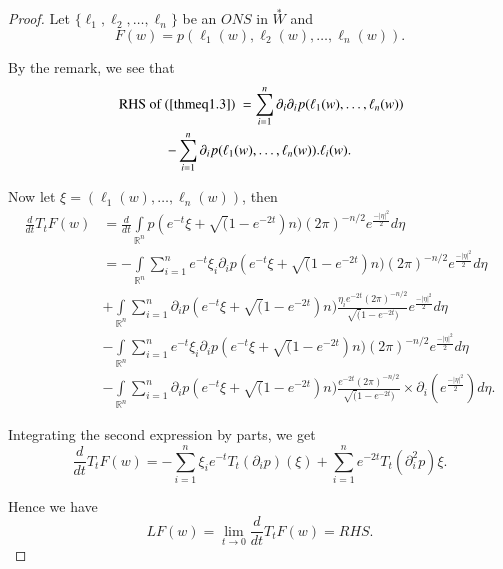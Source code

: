 \begin{proof}
Let $\{\ell_1, \ell_2, \ldots, \ell_n\}$ be an $ONS$ in $\overset{\ast}{W}$ and 
\begin{equation*}
  F(w) = p (\ell_1 (w), \ell_2(w),\ldots, \ell_n (w)).\tag*{$\Box$}
\end{equation*}

By the remark, we see that
\begin{multline*}
  \text{ RHS of  (\ref{thmeq1.3}) } = \sum\limits^{n}_{i=1} \partial_i
  \partial_i 
  p (\ell_1 (w), \ldots, \ell_n (w))\\  
  -\sum^{n}_{i = 1} \partial_i p (\ell_1 (w),
  \ldots, \ell_n (w)). \ell_i (w). 
\end{multline*}

Now let $\xi = (\ell_1 (w), \ldots, \ell_n (w))$, then
\begin{align*}
  \frac{d}{dt} T_tF(w) 
 &= \frac{d}{dt} \int\limits_{\mathbb{R}^n} p
  (e^{-t}\xi + \surd (1 -e^{-2t})n) (2
  \pi)^{-n/2} e^{\frac{-|\eta|^2}{2}}d \eta\\ 
 & = - \int\limits_{\mathbb{R}^n} \sum^{n}_{i = 1} e^{-t} \xi_i
  \partial_i p (e^{-t}\xi + \surd (1 -e^{-2t})n) (2
  \pi)^{-n/2}e^{\frac{-|\eta|^2}{2}}d \eta\\  
 & + \int\limits_{\mathbb{R}^n} \sum^{n}_{i = 1} \partial_i p(e^{-t}
  \xi + \surd (1-e^{-2t})n) \frac{\eta_i e^{-2t} (2\pi)^{-n /2}}{\surd
    (1 - e^{-2t})}e^{\frac{-|\eta|^2}{2}}d \eta \\ 
 & - \int\limits_{\mathbb{R}^n} \sum^{n}_{i = 1}  e^{-t} \xi_i
  \partial_i p (e^{-t} \xi + \surd (1-e^{-2t})n) (2
  \pi)^{-n/2}e^{\frac{-|\eta|^2}{2}}d \eta\\ 
 & -\int\limits_{\mathbb{R}^n} \sum^{n}_{i = 1} \partial_i p(e^{-t}\xi
  + \surd (1 - e^{-2t})n) \frac{e^{-2t} (2 \pi)^{- n / 2}}{\surd (1 -
    e^{-2t})} \times \partial_i (e^\frac{-|\eta|^2}{2})d \eta. 
\end{align*}\pageoriginale

Integrating the second expression by parts, we get
$$
\frac{d}{dt}T_tF(w) = - \sum^{n}_{i = 1} \xi_i e^{-t}T_t (\partial_i
p)(\xi) + \sum^{n}_{i = 1} e^{-2t}T_t (\partial^2_i p)\xi. 
$$

Hence we have
$$
LF (w) = \lim\limits_{t \to 0} \frac{d}{dt} T_tF(w) = RHS.
$$
\end{proof}

